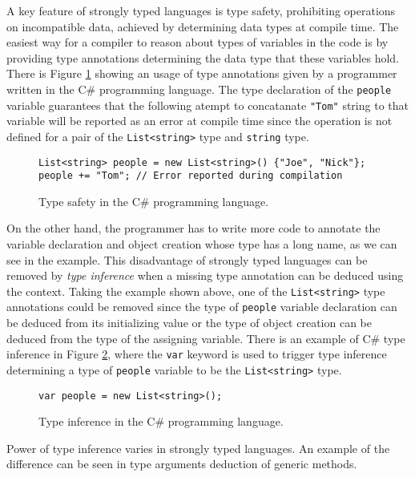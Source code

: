 A key feature of strongly typed languages is type safety, prohibiting operations on incompatible data, achieved by determining data types at compile time. 
The easiest way for a compiler to reason about types of variables in the code is by providing type annotations determining the data type that these variables hold. 
There is Figure \ref{img01:csharp_type_sef} showing an usage of type annotations given by a programmer written in the C\# programming language. 
The type declaration of the \texttt{people} variable guarantees that the following atempt to concatanate \texttt{"Tom"} string to that variable will be reported as an error at compile time since the operation is not defined for a pair of the \texttt{List<string>} type and \texttt{string} type.
\begin{figure}[h]
\begin{lstlisting}[style=csharp]
List<string> people = new List<string>() {"Joe", "Nick"};
people += "Tom"; // Error reported during compilation
\end{lstlisting}
\caption{Type safety in the C\# programming language.}
\label{img01:csharp_type_sef}
\end{figure}
\par
On the other hand, the programmer has to write more code to annotate the variable declaration and object creation whose type has a long name, as we can see in the example. 
This disadvantage of strongly typed languages can be removed by \textit{type inference} when a missing type annotation can be deduced using the context. 
Taking the example shown above, one of the \texttt{List<string>} type annotations could be removed since the type of \texttt{people} variable declaration can be deduced from its initializing value or the type of object creation can be deduced from the type of the assigning variable.
There is an example of C\# type inference in Figure \ref{img02:csharp_type_inf}, where the \texttt{var} keyword is used to trigger type inference determining a type of \texttt{people} variable to be the \texttt{List<string>} type.
\begin{figure}[h]
\begin{lstlisting}[style=csharp]
var people = new List<string>();
\end{lstlisting}
\caption{Type inference in the C\# programming language.}
\label{img02:csharp_type_inf}
\end{figure}
\par
Power of type inference varies in strongly typed languages.
An example of the difference can be seen in type arguments deduction of generic methods. 
